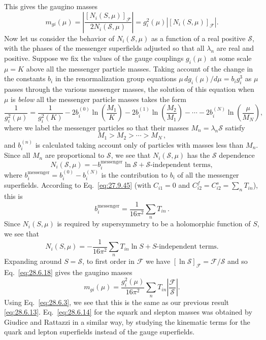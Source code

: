 This gives the gaugino masses
\begin{equation}
  m_{gi}(\mu)
  =\left|
    \frac{[N_i(S,\mu)]_{\mathcal{F}}}{2N_i(\mathcal{S},\mu)}
  \right|
  =g_i^2(\mu)\left|[N_i(S,\mu)]_{\mathcal{F}}\right|.
  \tag{28.6.18}\label{eq:28.6.18}
\end{equation}
Now let us consider the behavior of \(N_i(\mathcal{S},\mu)\) as a function
of a real positive \(\mathcal{S}\), with the phases of the messenger
superfields adjusted so that all \(\lambda_n\) are real and positive.
Suppose we fix the values of the gauge couplings \(g_i(\mu)\) at some
scale \(\mu=K\) above all the messenger particle masses. Taking account
of the change in the constants \(b_i\) in the renormalization group
equations \(\mu\,dg_i(\mu)/d\mu=b_i g_i^3\) as \(\mu\) passes through the
various messenger masses, the solution of this equation when \(\mu\) is
\emph{below} all the messenger particle masses takes the form
\[
  \frac{1}{g_i^2(\mu)}
  =\frac{1}{g_i^2(K)}
   -2b_i^{(0)}\ln\left(\frac{M_1}{K}\right)
   -2b_i^{(1)}\ln\left(\frac{M_2}{M_1}\right)
   -\cdots
   -2b_i^{(N)}\ln\left(\frac{\mu}{M_N}\right),
\]
where we label the messenger particles so that their masses
\(M_n=\lambda_n\mathcal{S}\) satisfy
\[
  M_1>M_2>\cdots>M_N\,,
\]
and \(b_i^{(n)}\) is calculated taking account only of particles with
masses less than \(M_n\). Since all \(M_n\) are proportional to
\(\mathcal{S}\), we see that \(N_i(\mathcal{S},\mu)\) has the
\(\mathcal{S}\) dependence
\begin{equation}
  N_i(\mathcal{S},\mu)
  =-b_i^{\mathrm{messenger}}\ln\mathcal{S}
   +\mathcal{S}\text{-independent terms},
  \tag{28.6.19}\label{eq:28.6.19}
\end{equation}
where
\(b_i^{\mathrm{messenger}}=b_i^{(0)}-b_i^{(N)}\) is the contribution to
\(b_i\) of all the messenger superfields. According to
Eq.~\eqref{eq:27.9.45} (with \(C_{i1}=0\) and
\(C_{i2}^{f}=C_{i2}^{s}=\sum_nT_{in}\)), this is
\begin{equation}
  b_i^{\mathrm{messenger}}
  =\frac{1}{16\pi^2}\sum_nT_{in}\,.
  \tag{28.6.20}\label{eq:28.6.20}
\end{equation}
Since \(N_i(S,\mu)\) is required by supersymmetry to be a holomorphic
function of \(S\), we see that
\begin{equation}
  N_i(S,\mu)
  =-\frac{1}{16\pi^2}\sum_nT_{in}\ln S
   +S\text{-independent terms}.
  \tag{28.6.21}\label{eq:28.6.21}
\end{equation}
Expanding around \(S=\mathcal{S}\), to first order in \(\mathcal{F}\) we
have \([\ln\mathcal{S}]_{\mathcal{F}}=\mathcal{F}/\mathcal{S}\) and so
Eq.~\eqref{eq:28.6.18} gives the gaugino masses
\begin{equation}
  m_{gi}(\mu)
  =\frac{g_i^2(\mu)}{16\pi^2}\sum_nT_{in}
   \left|\frac{\mathcal{F}}{\mathcal{S}}\right|.
  \tag{28.6.22}\label{eq:28.6.22}
\end{equation}
Using Eq.~\eqref{eq:28.6.3}, we see that this is the same as our previous
result \eqref{eq:28.6.13}. Eq.~\eqref{eq:28.6.14} for the squark and
slepton masses was obtained by Giudice and Rattazzi in a similar way, by
studying the kinematic terms for the quark and lepton superfields instead
of the gauge superfields.

